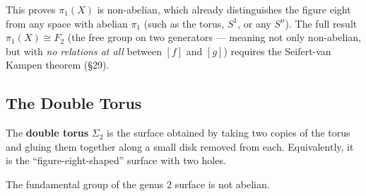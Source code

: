 \documentclass[11pt]{report}
\begin{document}
\begin{rembox}
This proves $\pi_1(X)$ is non-abelian, which already distinguishes the figure eight from any space with abelian $\pi_1$ (such as the torus, $S^1$, or any $S^n$). The full result $\pi_1(X) \cong F_2$ (the free group on two generators --- meaning not only non-abelian, but with \emph{no relations at all} between $[f]$ and $[g]$) requires the Seifert-van Kampen theorem (\S 29).
\end{rembox}

\subsection{The Double Torus}

\begin{defbox}
The \textbf{double torus} $\Sigma_2$ is the surface obtained by taking two copies of the torus and gluing them together along a small disk removed from each. Equivalently, it is the ``figure-eight-shaped'' surface with two holes.
\end{defbox}

\begin{thmbox}
The fundamental group of the genus $2$ surface is not abelian.
\end{thmbox}
\end{document}

